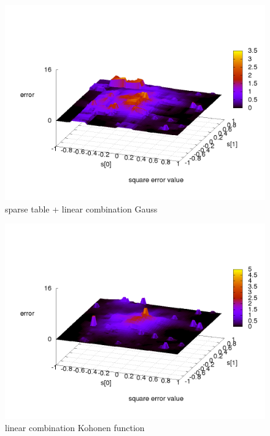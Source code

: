 \begin{figure}[!htb]
\centering
\includegraphics[scale=.4]{../../results_q_learning/map_1/function_type_3/q_learning_error.png}
\caption{sparse table + linear combination Gauss}
\end{figure}



\begin{figure}[!htb]
\centering
\includegraphics[scale=.4]{../../results_q_learning/map_1/function_type_4/q_learning_error.png}
\caption{linear combination Kohonen function}
\end{figure}






